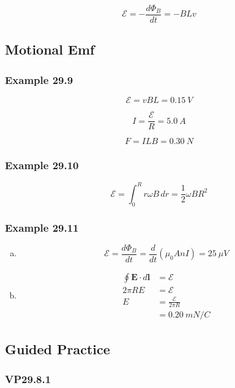 \documentclass{article}
\begin{document}
\[\mathcal{E} = -\frac{d \Phi_B}{dt} = -B L v\]

\setcounter{subsection}{3}
\subsection{Motional Emf}

\subsubsection{Example 29.9}

\[\mathcal{E} = v B L = \qty{0.15}{V}\]

\[I = \frac{\mathcal{E}}{R} = \qty{5.0}{A}\]

\[F = I L B = \qty{0.30}{N}\]

\subsubsection{Example 29.10}

\[\mathcal{E} = \int_0^R r \omega B \,dr = \frac{1}{2} \omega B R^2\]

\subsubsection{Example 29.11}

\begin{enumerate}[(a)]
  \item \[\mathcal{E} = \frac{d \Phi_B}{dt} = \frac{d}{dt} (\mu_0 A n I) = \qty{25}{\mu V}\]

  \item

        \begin{align*}
          \oint \mathbf{E} \cdot d \mathbf{l} & = \mathcal{E}                 \\
          2 \pi R E                           & = \mathcal{E}                 \\
          E                                   & = \frac{\mathcal{E}}{2 \pi R} \\
                                              & = \qty{0.20}{mN/C}
        \end{align*}
\end{enumerate}

\subsection{Guided Practice}

\subsubsection{VP29.8.1}
\end{document}
